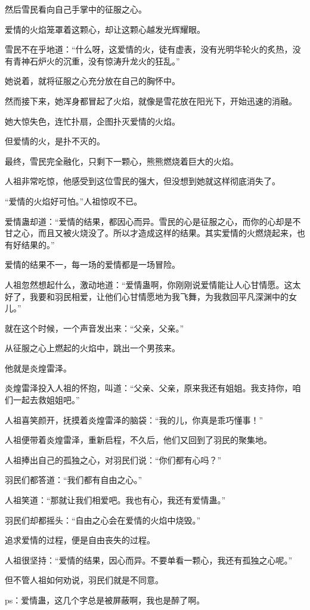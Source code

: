 \begin{this_body}
然后雪民看向自己手掌中的征服之心。

爱情的火焰笼罩着这颗心，却让这颗心越发光辉耀眼。

雪民不在乎地道：“什么呀，这爱情的火，徒有虚表，没有光明华轮火的炙热，没有青神石炉火的沉重，没有惊涛升龙火的狂乱。”

她说着，就将征服之心充分放在自己的胸怀中。

然而接下来，她浑身都冒起了火焰，就像是雪花放在阳光下，开始迅速的消融。

她大惊失色，连忙扑扇，企图扑灭爱情的火焰。

但爱情的火，是扑不灭的。

最终，雪民完全融化，只剩下一颗心，熊熊燃烧着巨大的火焰。

人祖非常吃惊，他感受到这位雪民的强大，但没想到她就这样彻底消失了。

“爱情的火焰好可怕。”人祖惊叹不已。

爱情蛊却道：“爱情的结果，都因心而异。雪民的心是征服之心，而你的心却是不甘之心，而且又被火烧没了。所以才造成这样的结果。其实爱情的火燃烧起来，也有好结果的。”

爱情的结果不一，每一场的爱情都是一场冒险。

人祖忽然想起什么，激动地道：“爱情蛊啊，你刚刚说爱情能让人心甘情愿。这太好了，我要和羽民相爱，让他们心甘情愿地为我飞舞，为我救回平凡深渊中的女儿。”

就在这个时候，一个声音发出来：“父亲，父亲。”

从征服之心上燃起的火焰中，跳出一个男孩来。

他就是炎煌雷泽。

炎煌雷泽投入人祖的怀抱，叫道：“父亲、父亲，原来我还有姐姐。我支持你，咱们一起去救姐姐吧。”

人祖喜笑颜开，抚摸着炎煌雷泽的脑袋：“我的儿，你真是乖巧懂事！”

人祖便带着炎煌雷泽，重新启程，不久后，他们又回到了羽民的聚集地。

人祖捧出自己的孤独之心，对羽民们说：“你们都有心吗？”

羽民们都答道：“我们都有自由之心。”

人祖笑道：“那就让我们相爱吧。我也有心，我还有爱情蛊。”

羽民们却都摇头：“自由之心会在爱情的火焰中烧毁。”

追求爱情的过程，便是自由丧失的过程。

人祖很坚持：“爱情的结果，因心而异。不要单看一颗心，我还有孤独之心呢。”

但不管人祖如何劝说，羽民们就是不同意。

ps：爱情蛊，这几个字总是被屏蔽啊，我也是醉了啊。

\end{this_body}


